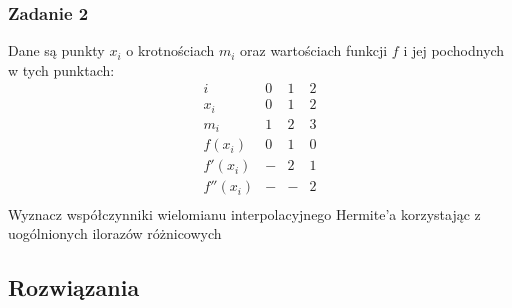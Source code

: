 \documentclass[a4paper]{article}
\begin{document}
\subsubsection*{Zadanie 2}
Dane są punkty $x_i$ o krotnościach $m_i$ oraz wartościach funkcji $f$ i jej pochodnych w tych punktach:
$$\begin{array}{c|ccc}
i&0&1&2\\
\hline
x_i&0&1&2\\
m_i&1&2&3\\
f(x_i)&0&1&0\\
f'(x_i)&-&2&1\\
f''(x_i)&-&-&2\\
\end{array}$$
Wyznacz współczynniki wielomianu interpolacyjnego Hermite'a korzystając z uogólnionych ilorazów różnicowych

\subsection{Rozwiązania}
\end{document}

